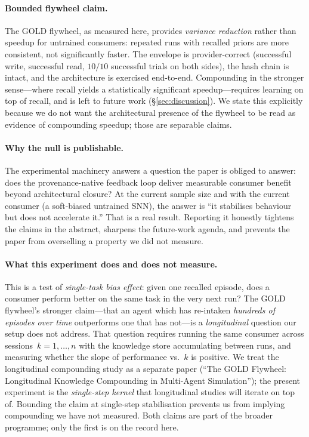 \documentclass[sigchi-a]{acmart}
\begin{document}
\paragraph{Bounded flywheel claim.}
The GOLD flywheel, as measured here, provides \emph{variance
reduction} rather than speedup for untrained consumers: repeated
runs with recalled priors are more consistent, not
significantly faster. The envelope is provider-correct
(successful write, successful read, $10/10$ successful trials on
both sides), the hash chain is intact, and the architecture is
exercised end-to-end. Compounding in the stronger sense---where
recall yields a statistically significant speedup---requires
learning on top of recall, and is left to future work
(\S\ref{sec:discussion}). We state this explicitly because we do not
want the architectural presence of the flywheel to be read as
evidence of compounding speedup; those are separable claims.

\paragraph{Why the null is publishable.}
The experimental machinery answers a question the paper is obliged
to answer: does the provenance-native feedback loop deliver
measurable consumer benefit beyond architectural closure?
At the current sample size and with the current consumer (a
soft-biased untrained SNN), the answer is ``it stabilises
behaviour but does not accelerate it.'' That is a real result.
Reporting it honestly tightens the claims in the abstract, sharpens
the future-work agenda, and prevents the paper from overselling a
property we did not measure.

\paragraph{What this experiment does and does not measure.}
This is a test of \emph{single-task bias effect}: given one recalled
episode, does a consumer perform better on the same task in the very
next run? The GOLD flywheel's stronger claim---that an agent which
has re-intaken \emph{hundreds of episodes over time} outperforms one
that has not---is a \emph{longitudinal} question our setup does not
address. That question requires running the same consumer across
sessions~$k = 1, \ldots, n$ with the knowledge store accumulating
between runs, and measuring whether the slope of performance vs.\ $k$
is positive. We treat the longitudinal compounding study as a
separate paper (``The GOLD Flywheel: Longitudinal Knowledge Compounding
in Multi-Agent Simulation''); the present experiment is the
\emph{single-step kernel} that longitudinal studies will iterate on
top of. Bounding the claim at single-step stabilisation prevents us
from implying compounding we have not measured. Both claims are part
of the broader programme; only the first is on the record here.
\end{document}
